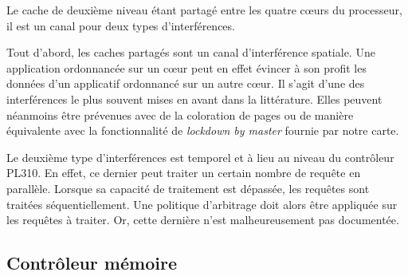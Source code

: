 
            Le cache de deuxième niveau étant partagé entre les quatre cœurs du processeur, il est un canal pour deux types d'interférences.

            Tout d'abord, les caches partagés sont un canal d'interférence spatiale.
            Une application ordonnancée sur un cœur peut en effet évincer à son profit les données d'un applicatif ordonnancé sur un autre cœur.
            Il s'agit d'une des interférences le plus souvent mises en avant dans la littérature.
            Elles peuvent néanmoins être prévenues avec de la coloration de pages ou de manière équivalente avec la fonctionnalité de \emph{lockdown by master} fournie par notre carte.

            Le deuxième type d'interférences est temporel et à lieu au niveau du contrôleur PL310.
            En effet, ce dernier peut traiter un certain nombre de requête en parallèle.
            Lorsque sa capacité de traitement est dépassée, les requêtes sont traitées séquentiellement.
            Une politique d'arbitrage doit alors être appliquée sur les requêtes à traiter.
            Or, cette dernière n'est malheureusement pas documentée.


    \subsection{Contrôleur mémoire}
    \label{subsection:controleur_memoire}

